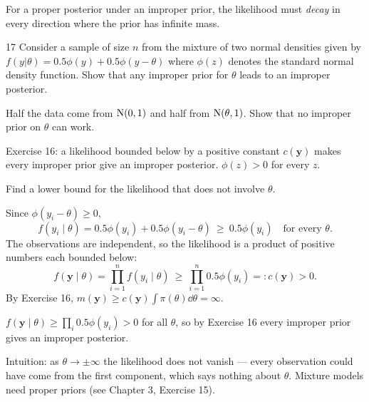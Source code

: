 \documentclass[11pt]{article}
\begin{document}
\begin{takeaway}
For a proper posterior under an improper prior, the likelihood must \emph{decay} in every direction where the prior has infinite mass.
\end{takeaway}


\begin{problem}{17}
Consider a sample of size $n$ from the mixture of two normal densities given by $f(y|\theta)=0.5\phi(y)+0.5\phi(y-\theta)$ where $\phi(z)$ denotes the standard normal density function. Show that any improper prior for $\theta$ leads to an improper posterior.
\end{problem}

\begin{restate}
Half the data come from $\mathrm{N}(0,1)$ and half from $\mathrm{N}(\theta,1)$. Show that no improper prior on $\theta$ can work.
\end{restate}

\begin{recall}
Exercise 16: a likelihood bounded below by a positive constant $c(\mathbf y)$ makes every improper prior give an improper posterior. $\phi(z)>0$ for every $z$.
\end{recall}

\begin{keyidea}
Find a lower bound for the likelihood that does not involve $\theta$.
\end{keyidea}

\solution
{} Since $\phi(y_i-\theta)\ge0$,
\[
f(y_i\mid\theta)=0.5\phi(y_i)+0.5\phi(y_i-\theta)\ \ge\ 0.5\phi(y_i)\quad\text{for every }\theta.
\]
 The observations are independent, so the likelihood is a product of positive numbers each bounded below:
\[
f(\mathbf y\mid\theta)=\prod_{i=1}^n f(y_i\mid\theta)\ \ge\ \prod_{i=1}^n0.5\phi(y_i)=:c(\mathbf y)>0.
\]
 By Exercise 16, $m(\mathbf y)\ge c(\mathbf y)\int\pi(\theta)\dd\theta=\infty$.

\begin{answer}
$f(\mathbf y\mid\theta)\ge\prod_i0.5\phi(y_i)>0$ for all $\theta$, so by Exercise 16 every improper prior gives an improper posterior.
\end{answer}

\begin{takeaway}
Intuition: as $\theta\to\pm\infty$ the likelihood does not vanish --- every observation could have come from the first component, which says nothing about $\theta$. Mixture models need proper priors (see Chapter 3, Exercise 15).
\end{takeaway}
\end{document}
